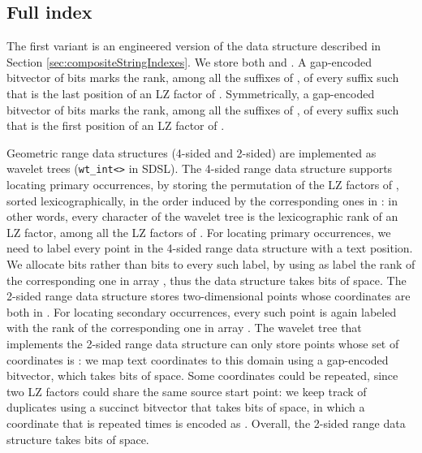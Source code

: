 \documentclass[a4paper,UKenglish]{lipics-v2016}
\begin{document}
\subsection{Full index}

The first variant is an engineered version of the data structure described in Section \ref{sec:compositeStringIndexes}. We store both  and . A gap-encoded bitvector  of  bits marks the rank, among all the suffixes of , of every suffix  such that  is the last position of an LZ factor of . Symmetrically, a gap-encoded bitvector  of  bits marks the rank, among all the suffixes of , of every suffix  such that  is the first position of an LZ factor of . 

Geometric range data structures (4-sided and 2-sided) are implemented as wavelet trees (\texttt{wt\_int<>} in SDSL). The 4-sided range data structure supports locating primary occurrences, by storing the permutation of the  LZ factors of , sorted lexicographically, in the order induced by the corresponding ones in : in other words, every character of the wavelet tree is the lexicographic rank of an LZ factor, among all the LZ factors of . For locating primary occurrences, we need to label every point in the 4-sided range data structure with a text position. We allocate  bits rather than  bits to every such label, by using as label the rank of the corresponding one in array , thus the data structure takes  bits of space. The 2-sided range data structure stores  two-dimensional points whose coordinates are both in . For locating secondary occurrences, every such point is again labeled with the rank of the corresponding one in array . The wavelet tree that implements the 2-sided range data structure can only store points whose set of  coordinates is : we map text coordinates to this domain using a gap-encoded bitvector, which takes  bits of space. Some coordinates could be repeated, since two LZ factors could share the same source start point: we keep track of duplicates using a succinct bitvector that takes  bits of space, in which a coordinate that is repeated  times is encoded as . Overall, the 2-sided range data structure takes  bits of space.
\end{document}

